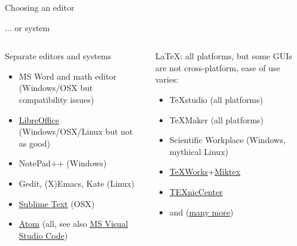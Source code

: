\documentclass[xcolor=table,compress]{beamer}
\begin{document}
\begin{frame}{Choosing an editor}
\begin{block}{... or system}
\begin{columns}[t]
\begin{column}{.48\textwidth}
\color{red}
Separate editors and systems 
\begin{itemize}
\item MS Word and math editor (Windows/OSX but compatibility issues)
\item \href{http://www.libreoffice.org}{LibreOffice} (Windows/OSX/Linux but not as good)
\item NotePad++ (Windows)
\item Gedit, (X)Emacs, Kate (Linux)
\item \href{http://www.sublimetext.com/3}{Sublime Text} (OSX)
\item \href{http://atom.io}{Atom} (all, see also \href{https://code.visualstudio.com/}{MS Visual 
Studio Code})
\end{itemize}
\end{column}
\hfill
\begin{column}{.48\textwidth}
{\color{red}
\LaTeX}: all platforms, but some GUIs are not cross-platform, ease of use varies:
\begin{itemize}
\item TeXstudio (all platforms)
\item TeXMaker (all platforms)
\item Scientific Workplace (Windows, mythical Linux) 
\item \href{http://www.tug.org/texworks/}{TeXWorks}+\href{http://miktex.org/}{Miktex}
\item \href{http://www.texniccenter.org/}{TEXnicCenter}
\item and  (\href{http://alternativeto.net/software/texmaker/}{many more})
\end{itemize}
\end{column}
\end{columns}
\end{block}
\end{frame}
\end{document}
